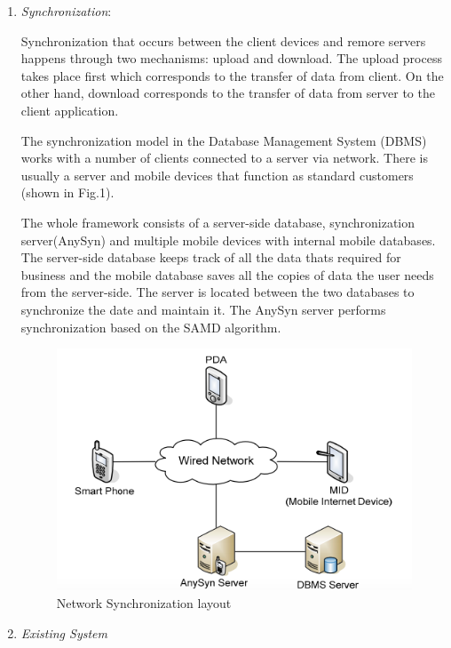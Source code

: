 \documentclass[conference]{IEEEtran}
\begin{document}
\begin{enumerate}[label=(\Alph*)]
\setlength\itemsep{1em}
\item  \textit{Synchronization}:

Synchronization that occurs between the client devices and remore servers happens through two mechanisms: upload and download. The upload process takes place first which corresponds to the transfer of data from client. On the other hand, download corresponds to the transfer of data from server to the client application.

The synchronization model in the Database Management System (DBMS) works with a number of clients connected to a server via network. There is usually a server and mobile devices that function as standard customers (shown in Fig.1). 

The whole framework consists of a server-side database, synchronization server(AnySyn) and multiple mobile devices with internal mobile databases. The server-side database keeps track of all the data thats required for business and the mobile database saves all the copies of data the user needs from the server-side. The server is located between the two databases to synchronize the date and maintain it. The AnySyn server performs synchronization based on the SAMD algorithm.

\begin{figure}[h]
	\centering
	\includegraphics[width=1.1\linewidth]{sync.png} 
	\caption{Network Synchronization layout}
	\label{fig:sync1}
\end{figure}

\item \textit{Existing System}


\end{enumerate}
\end{document}
